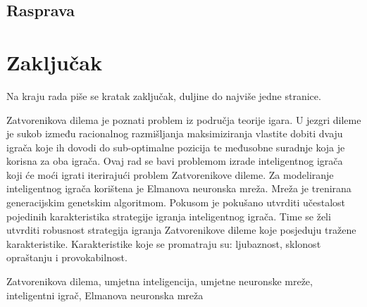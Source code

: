 \documentclass[zavrsnirad]{fer}
\begin{document}
	\section{Rasprava}




\chapter{Zaključak}
\label{pog:zakljucak}

Na kraju rada piše se kratak zaključak, duljine do najviše jedne stranice. 








\begin{sazetak}
	
	Zatvorenikova dilema je poznati problem iz područja teorije igara. U jezgri dileme je sukob između racionalnog razmišljanja maksimiziranja vlastite dobiti dvaju igrača koje ih dovodi do sub-optimalne pozicija te međusobne suradnje koja je korisna za oba igrača. Ovaj rad se bavi problemom izrade inteligentnog igrača koji će moći igrati iterirajući problem Zatvorenikove dileme. Za modeliranje inteligentnog igrača korištena je Elmanova neuronska mreža. Mreža je trenirana generacijskim genetskim algoritmom. Pokusom je pokušano utvrditi učestalost pojedinih karakteristika strategije igranja inteligentnog igrača. Time se želi utvrditi robusnost strategija igranja Zatvorenikove dileme koje posjeduju tražene karakteristike. Karakteristike koje se promatraju su: ljubaznost, sklonost opraštanju i provokabilnost.

\end{sazetak}

\begin{kljucnerijeci}
	Zatvorenikova dilema, umjetna inteligencija, umjetne neuronske mreže, inteligentni igrač, Elmanova neuronska mreža
\end{kljucnerijeci}
\end{document}
